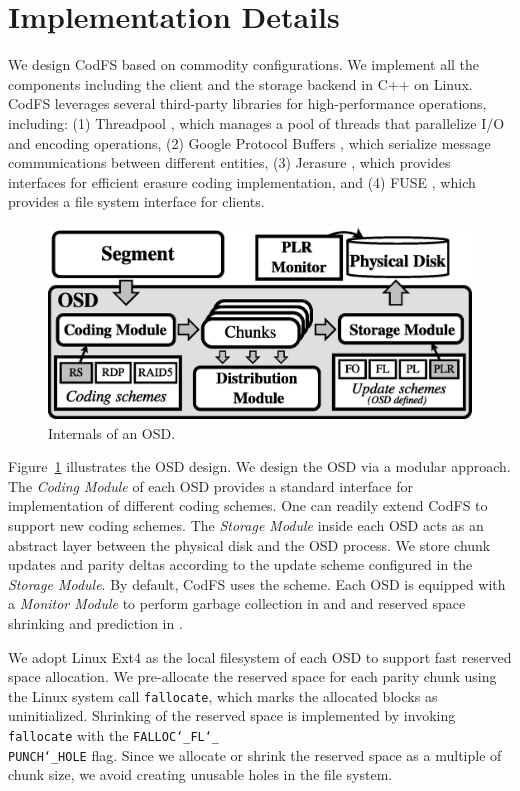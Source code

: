 \section{Implementation Details}
\label{sec:implementation}

We design CodFS based on commodity configurations. We implement all the
components including the client and the storage backend in C++ on Linux.
CodFS leverages several third-party libraries for high-performance operations,
including: (1) Threadpool \cite{boosttp}, which manages a pool of threads that
parallelize I/O and encoding operations, (2) Google Protocol Buffers
\cite{protobuf}, which serialize message communications between different
entities, (3) Jerasure \cite{plank09}, which provides interfaces for
efficient erasure coding implementation, and (4) FUSE \cite{fuse}, which
provides a file system interface for clients.

\begin{figure}[t]
 \centering
 \includegraphics[width=0.7\linewidth]{figs/osd_implement}
 \caption{Internals of an OSD.}
 \label{fig:osd_implement}
\end{figure}

Figure~\ref{fig:osd_implement} illustrates the OSD design. 
We design the OSD via a modular approach. The \textit{Coding Module} of 
each OSD provides a standard interface for implementation of different coding
schemes.  One can readily extend CodFS to support new coding schemes.
The \textit{Storage Module} inside each OSD acts as an abstract layer between
the physical disk and the OSD process.  We store chunk updates and parity
deltas according to the update scheme configured in the \textit{Storage
Module}.  By default, CodFS uses the \PLR scheme. Each OSD is equipped with
a \textit{Monitor Module} to perform garbage collection in \FL and \PL and
reserved space shrinking and prediction in \PLR.

We adopt Linux Ext4 as the local filesystem of each OSD to support fast
reserved space allocation.  We pre-allocate the reserved space for each parity
chunk using the Linux system call \texttt{fallocate}, which marks the
allocated blocks as uninitialized. 
Shrinking of the reserved space is implemented by invoking \texttt{fallocate}
with the \texttt{FALLOC\char`_FL\char`_\\PUNCH\char`_HOLE} flag. Since we
allocate or shrink the reserved space as a multiple of chunk size, we avoid
creating unusable holes in the file system.

